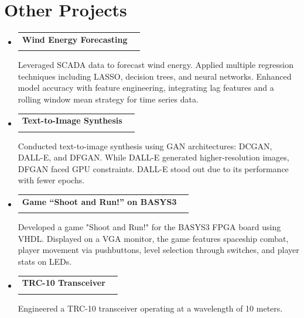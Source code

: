 \documentclass[letterpaper,11pt]{article}
\makeatletter
\newcommand{\resumeProjectsSubheading}[4]{
  \vspace{1pt}\item
    \begin{tabular*}{1.0\textwidth}[t]{l@{\extracolsep{\fill}}r}
      \textbf{#1} & \textbf{\small #2} \\
      \emph{#3} & \textbf{\small #4} \\
    \end{tabular*}\vspace{-2pt}
}
\newcommand{\resumeSubHeadingListStart}{\begin{itemize}[leftmargin=0.0in, label={}]}
\newcommand{\resumeSubHeadingListEnd}{\end{itemize}}
\makeatother
\begin{document}
\section{Other Projects}
    \resumeSubHeadingListStart
        \resumeProjectsSubheading{Wind Energy Forecasting}{}{}{}
        Leveraged SCADA data to forecast wind energy. Applied multiple regression techniques including LASSO, decision trees, and neural networks. Enhanced model accuracy with feature engineering, integrating lag features and a rolling window mean strategy for time series data.

        \resumeProjectsSubheading{Text-to-Image Synthesis}{}{}{}
        Conducted text-to-image synthesis using GAN architectures: DCGAN, DALL-E, and DFGAN. While DALL-E generated higher-resolution images, DFGAN faced GPU constraints. DALL-E stood out due to its performance with fewer epochs.

        \resumeProjectsSubheading{Game “Shoot and Run!” on BASYS3}{}{}{}
        Developed a game "Shoot and Run!" for the BASYS3 FPGA board using VHDL. Displayed on a VGA monitor, the game features spaceship combat, player movement via pushbuttons, level selection through switches, and player stats on LEDs.

        \resumeProjectsSubheading{TRC-10 Transceiver}{}{}{}
        Engineered a TRC-10 transceiver operating at a wavelength of 10 meters.
    \resumeSubHeadingListEnd



     
\vspace{-8mm}
\end{document}
